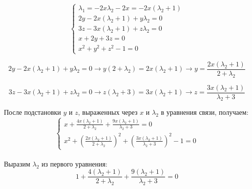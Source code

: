 \documentclass[a5paper, 10pt]{article}
\theoremstyle{definition}
\theoremstyle{plain}
\theoremstyle{remark}
\begin{document}
\begin{equation}
\begin{cases}
 \lambda_1  = -2x \lambda_2 -2x = -2x(\lambda_2 + 1)\\
2y -2x(\lambda_2 + 1)  + y \lambda_2  = 0\\
3z -3x(\lambda_2 + 1) + z \lambda_2  = 0\\
 x + 2y+3z = 0\\
x^2 +y^2+z^2 - 1 = 0
\end{cases}
\end{equation}

\begin{equation}
2y -2x(\lambda_2 + 1)  + y \lambda_2  =0 \to  y(2+\lambda_2) = 2x(\lambda_2 + 1) \to y = \frac{2x(\lambda_2 + 1)}{2+\lambda_2}
\end{equation}

\begin{equation}
3z -3x(\lambda_2 + 1) + z \lambda_2  = 0 \to z(\lambda_2 + 3) = 3x(\lambda_2 + 1) \to z = \frac{ 3x(\lambda_2 + 1)}{\lambda_2 + 3}
\end{equation}

После подстановки $y$ и $z$, выраженных через $x$ и $\lambda_2$ в уравнения связи, получаем:
\begin{equation}
\begin{cases}
 x + \frac{4x(\lambda_2 + 1)}{2+\lambda_2}+\frac{9x(\lambda_2 + 1)}{\lambda_2 + 3} = 0\\
x^2 +\left(  \frac{2x(\lambda_2 + 1)}{2+\lambda_2} \right)^2+\left( \frac{ 3x(\lambda_2 + 1)}{\lambda_2 + 3} \right)^2 - 1 = 0
\end{cases}
\end{equation}
\\
Выразим $\lambda_2$ из первого уравнения:
\begin{equation}
 1 + \frac{4(\lambda_2 + 1)}{2+\lambda_2}+\frac{9(\lambda_2 + 1)}{\lambda_2 + 3} = 0
\end{equation}
\end{document}
